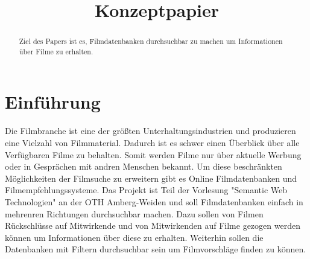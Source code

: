 \documentclass[conference]{IEEEtran}
\begin{document}
\title{Konzeptpapier}

\author{
	\and

	\and

	\and

	\and

}

\maketitle

\begin{abstract}
	Ziel des Papers ist es, Filmdatenbanken durchsuchbar zu machen um Informationen über Filme zu erhalten.
\end{abstract}


\section{Einführung}

Die Filmbranche ist eine der größten Unterhaltungsindustrien und produzieren eine Vielzahl von Filmmaterial.
Dadurch ist es schwer einen Überblick über alle Verfügbaren Filme zu behalten.
Somit werden Filme nur über aktuelle Werbung oder in Gesprächen mit andren Menschen bekannt.
Um diese beschränkten Möglichkeiten der Filmsuche zu erweitern gibt es Online Filmdatenbanken und Filmempfehlungssysteme.
Das Projekt ist Teil der Vorlesung "Semantic Web Technologien" an der OTH Amberg-Weiden und soll Filmdatenbanken einfach in mehrenren Richtungen durchsuchbar machen.
Dazu sollen von Filmen Rückschlüsse auf Mitwirkende und von Mitwirkenden auf Filme gezogen werden können um Informationen über diese zu erhalten.
Weiterhin sollen die Datenbanken mit Filtern durchsuchbar sein um Filmvorschläge finden zu können.
\end{document}
